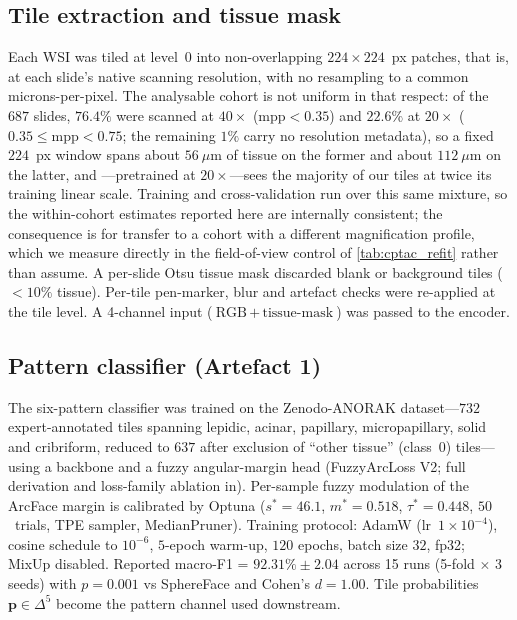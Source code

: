 \subsection*{Tile extraction and tissue mask}

Each WSI was tiled at level~0 into non-overlapping
$224 \times 224$~px patches, that is, at each slide's native scanning
resolution, with no resampling to a common microns-per-pixel.
The analysable cohort is not uniform in that respect: of the $687$
slides, $76.4\%$ were scanned at $40\times$
($\mathrm{mpp}\!<\!0.35$) and $22.6\%$ at $20\times$
($0.35\!\leq\!\mathrm{mpp}\!<\!0.75$; the remaining $1\%$ carry no
resolution metadata), so a fixed $224$~px window spans
about $56~\mu\text{m}$ of tissue on the former and about
$112~\mu\text{m}$ on the latter, and \ctranspath{}---pretrained at
$20\times$\cite{wang2022ctranspath}---sees the majority of our tiles at
twice its training linear scale.
Training and cross-validation run over this same mixture, so the
within-cohort estimates reported here are internally consistent; the
consequence is for transfer to a cohort with a different magnification
profile, which we measure directly in the field-of-view control of
\cref{tab:cptac_refit} rather than assume.
A per-slide Otsu tissue mask discarded blank or background tiles
($<10\%$ tissue).
Per-tile pen-marker, blur and artefact checks were re-applied at
the tile level.
A 4-channel input ($\text{RGB}\,+\,\text{tissue-mask}$) was passed
to the encoder.\cite{wang2022ctranspath}

\subsection*{Pattern classifier (Artefact 1)}

The six-pattern classifier was trained on the Zenodo-ANORAK
dataset\cite{anorak2024,ANORAKZenodo}---$732$ expert-annotated
tiles spanning lepidic, acinar, papillary, micropapillary,
solid and cribriform, reduced to $637$ after exclusion of
``other tissue'' (class~0) tiles---using a \ctranspath{}
backbone\cite{wang2022ctranspath} and a fuzzy angular-margin head
(FuzzyArcLoss V2; full derivation and loss-family ablation
in\cite{limareina2026fuzzyarc}).
Per-sample fuzzy modulation of the ArcFace
margin\cite{deng2019arcface} is calibrated by Optuna
($s^{*}=46.1$, $m^{*}=0.518$, $\tau^{*}=0.448$,
$50$~trials, TPE sampler, MedianPruner).
Training protocol: AdamW (lr~$1\times10^{-4}$), cosine schedule
to $10^{-6}$, $5$-epoch warm-up, $120$ epochs, batch size $32$,
fp32; MixUp disabled.
Reported macro-F1 = $92.31\% \pm 2.04$ across 15 runs (5-fold $\times$
3 seeds) with $p = 0.001$ vs SphereFace and Cohen's $d = 1.00$.
Tile probabilities $\mathbf{p}\in\Delta^5$ become the pattern
channel used downstream.

